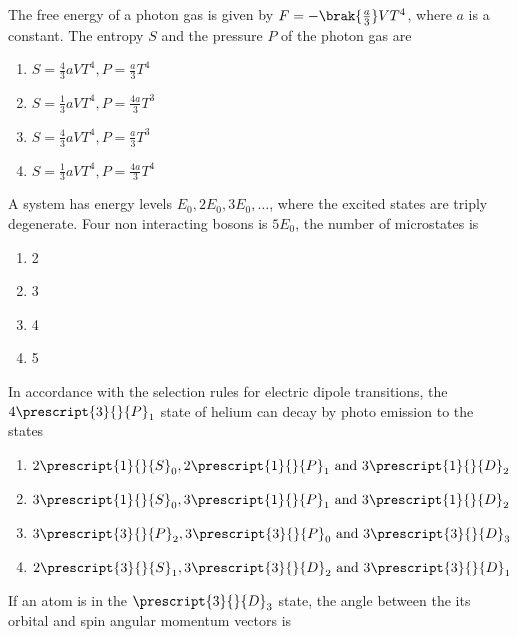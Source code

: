 \item The free energy of a photon gas is given by $F=-\brak{\frac{a}{3}}VT^4$, where $a$ is a constant. The entropy $S$ and the pressure $P$ of the photon gas are
\begin{multicols}{2}
    \begin{enumerate}
        \item $S=\frac{4}{3}aVT^4, P=\frac{a}{3}T^4$
        \item $S=\frac{1}{3}aVT^4, P=\frac{4a}{3}T^3$
        \item $S=\frac{4}{3}aVT^4, P=\frac{a}{3}T^3$
        \item $S=\frac{1}{3}aVT^4, P=\frac{4a}{3}T^4$
    \end{enumerate}
\end{multicols}
\item A system has energy levels $E_0,2E_0,3E_0,\dots$, where the excited states are triply degenerate. Four non interacting bosons is $5E_0$, the number of microstates is
\begin{multicols}{4}
    \begin{enumerate}
        \item 2
        \item 3
        \item 4
        \item 5
    \end{enumerate}
\end{multicols}
\item In accordance with the selection rules for electric dipole transitions, the $4\prescript{3}{}{P}_1$ state of helium can decay by photo emission to the states
\begin{multicols}{2}
    \begin{enumerate}
        \item $2\prescript{1}{}{S}_0,2\prescript{1}{}{P}_1 \text{ and } 3\prescript{1}{}{D}_2$
        \item $3\prescript{1}{}{S}_0,3\prescript{1}{}{P}_1 \text{ and } 3\prescript{1}{}{D}_2$
        \item $3\prescript{3}{}{P}_2,3\prescript{3}{}{P}_0 \text{ and } 3\prescript{3}{}{D}_3$
        \item $2\prescript{3}{}{S}_1,3\prescript{3}{}{D}_2 \text{ and } 3\prescript{3}{}{D}_1$
    \end{enumerate}
\end{multicols}
\item If an atom is in the $\prescript{3}{}{D}_3$ state, the angle between the its orbital and spin angular momentum vectors  is 
